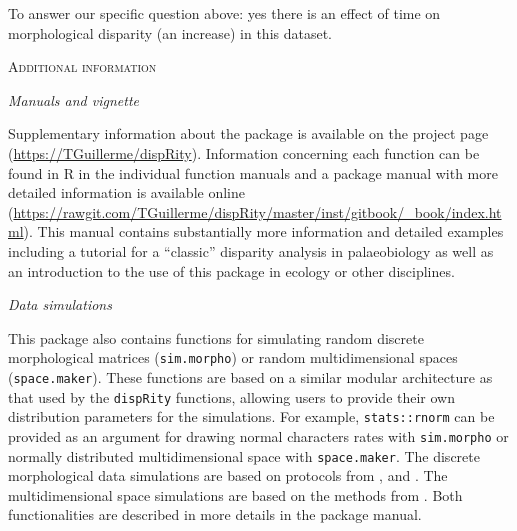 \documentclass[12pt,letterpaper]{article}
\renewcommand{\section}[1]{%
\bigskip
\begin{center}
\begin{Large}
\normalfont\scshape #1
\medskip
\end{Large}
\end{center}}
\renewcommand{\subsection}[1]{%
\bigskip
\begin{center}
\begin{large}
\normalfont\itshape #1
\end{large}
\end{center}}
\newcommand{\disp}{\texttt{dispRity} }
\begin{document}
To answer our specific question above: yes there is an effect of time on morphological disparity (an increase) in this dataset.

\section{Additional information}
\subsection{Manuals and vignette}
Supplementary information about the package is available on the project page (\url{https://TGuillerme/dispRity}).
Information concerning each function can be found in R in the individual function manuals and a package manual with more detailed information is available online (\url{https://rawgit.com/TGuillerme/dispRity/master/inst/gitbook/_book/index.html}).
This manual contains substantially more information and detailed examples including a tutorial for a ``classic'' disparity analysis in palaeobiology as well as an introduction to the use of this package in ecology or other disciplines. 

\subsection{Data simulations}
This package also contains functions for simulating random discrete morphological matrices (\texttt{sim.morpho}) or random multidimensional spaces (\texttt{space.maker}).
These functions are based on a similar modular architecture as that used by the \disp functions, allowing users to provide their own distribution parameters for the simulations.
For example, \texttt{stats::rnorm} can be provided as an argument for drawing normal characters rates with \texttt{sim.morpho} or normally distributed multidimensional space with \texttt{space.maker}.
The discrete morphological data simulations are based on protocols from \cite{GuillermeCooper}, \cite{OReilly20160081} and \cite{puttick2017uncertain}. 
The multidimensional space simulations are based on the methods from \cite{diaz2016global}.
Both functionalities are described in more details in the package manual.

\end{document}
